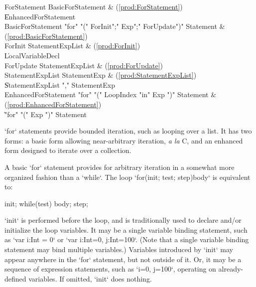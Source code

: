 \begin{bbgrammar}
        ForStatement \: BasicForStatement & (\ref{prod:ForStatement}) \\
                    \| EnhancedForStatement \\
   BasicForStatement \: \xcd"for" \xcd"(" ForInit\opt \xcd";" Exp\opt \xcd";" ForUpdate\opt \xcd")" Statement & (\ref{prod:BasicForStatement}) \\
             ForInit \: StatementExpList & (\ref{prod:ForInit}) \\
                    \| LocalVariableDecl \\
           ForUpdate \: StatementExpList & (\ref{prod:ForUpdate}) \\
    StatementExpList \: StatementExp & (\ref{prod:StatementExpList}) \\
                    \| StatementExpList \xcd"," StatementExp \\
EnhancedForStatement \: \xcd"for" \xcd"(" LoopIndex \xcd"in" Exp \xcd")" Statement & (\ref{prod:EnhancedForStatement}) \\
                    \| \xcd"for" \xcd"(" Exp \xcd")" Statement \\
\end{bbgrammar}

\xcd`for` statements provide bounded iteration, such as looping over a list.
It has two forms: a basic form allowing near-arbitrary iteration, {\em a la}
C, and an enhanced form designed to iterate over a collection.

A basic \xcd`for` statement provides for arbitrary iteration in a somewhat
more organized fashion than a \xcd`while`.  The loop 
\xcd`for(init; test; step)body` is
equivalent to: 
\begin{xten}
{
   init;
   while(test) {
      body;
      step;
   }
}
\end{xten}

\xcd`init` is performed before the loop, and is traditionally used to declare
and/or initialize the loop variables. It may be a single variable binding
statement, such as \xcd`var i:Int = 0` or \xcd`var i:Int=0, j:Int=100`. (Note
that a single variable binding statement may bind multiple variables.)
Variables introduced by \xcd`init` may appear anywhere in the \xcd`for`
statement, but not outside of it.  Or, it may be a sequence of expression
statements, such as \xcd`i=0, j=100`, operating on already-defined variables.
If omitted, \xcd`init` does nothing.

